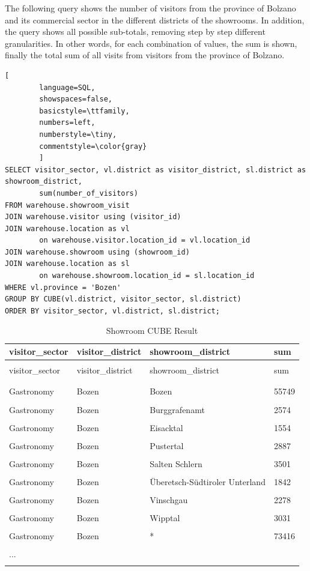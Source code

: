 \documentclass[letterpaper,12pt]{article}
\begin{document}
The following query shows the number of visitors from the province of Bolzano and its commercial sector in the different districts of the showrooms. In addition, the query shows all possible sub-totals, removing step by step different granularities. In other words, for each combination of values, the sum is shown, finally the total sum of all visits from visitors from the province of Bolzano.

\begin{lstlisting}[
        language=SQL,
        showspaces=false,
        basicstyle=\ttfamily,
        numbers=left,
        numberstyle=\tiny,
        commentstyle=\color{gray}
        ]
SELECT visitor_sector, vl.district as visitor_district, sl.district as showroom_district, 
        sum(number_of_visitors)
FROM warehouse.showroom_visit
JOIN warehouse.visitor using (visitor_id)
JOIN warehouse.location as vl 
        on warehouse.visitor.location_id = vl.location_id 
JOIN warehouse.showroom using (showroom_id)
JOIN warehouse.location as sl 
        on warehouse.showroom.location_id = sl.location_id
WHERE vl.province = 'Bozen'
GROUP BY CUBE(vl.district, visitor_sector, sl.district)
ORDER BY visitor_sector, vl.district, sl.district;
\end{lstlisting}

\begingroup
\renewcommand\arraystretch{0.5}
\begin{longtable}{p{4cm}p{4cm}p{4cm}p{4cm}}
        \caption{Showroom CUBE Result} \\
				visitor\_sector & visitor\_district & showroom\_district & sum \\
        \endfirsthead \\
        visitor\_sector & visitor\_district & showroom\_district & sum \\
        \endhead \\
				\hline \\
Gastronomy & Bozen & Bozen & 55749 \\
\hline \\
Gastronomy & Bozen & Burggrafenamt  & 2574 \\
\hline \\
Gastronomy & Bozen & Eisacktal & 1554 \\
\hline \\
Gastronomy & Bozen & Pustertal & 2887 \\
\hline \\
Gastronomy & Bozen & Salten Schlern & 3501 \\
\hline \\
Gastronomy & Bozen & Überetsch-Südtiroler Unterland & 1842 \\
\hline \\
Gastronomy & Bozen & Vinschgau & 2278 \\
\hline \\
Gastronomy & Bozen & Wipptal & 3031 \\
\hline \\
Gastronomy & Bozen & * & 73416 \\
\hline \\
... & & & \\
\hline \\
\end{longtable} 
\endgroup    
\end{document}
